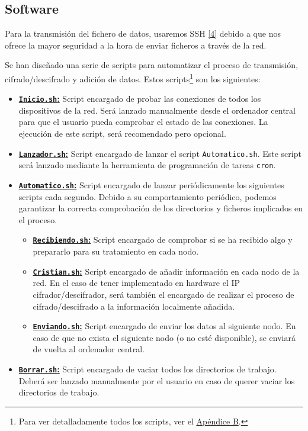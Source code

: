 \subsection{Software}
Para la transmisión del fichero de datos, usaremos SSH \hyperlink{4}{[4]} debido a que nos ofrece la mayor seguridad a la hora de enviar ficheros a través de la red.

Se han diseñado una serie de scripts para automatizar el proceso de transmisión, cifrado/descifrado y adición de datos. Estos scripts\footnote{Para ver detalladamente todos los scripts, ver el \hyperlink{Scripts}{Apéndice B}.} son los siguientes:
\begin{itemize}
	\item \hyperlink{ScriptConexion}{\textbf{\texttt{Inicio.sh}:}} Script encargado de probar las conexiones de todos los dispositivos de la red. Será lanzado manualmente desde el ordenador central para que el usuario pueda comprobar el estado de las conexiones. La ejecución de este script, será recomendado pero opcional.
	\item \hyperlink{ScriptLanzador}{\textbf{\texttt{Lanzador.sh}:}} Script encargado de lanzar el script \texttt{Automatico.sh}. Este script será lanzado mediante la herramienta de programación de tareas \texttt{cron}.
	\item \hyperlink{ScriptAutomatico}{\textbf{\texttt{Automatico.sh}:}} Script encargado de lanzar periódicamente los siguientes scripts cada segundo. Debido a su comportamiento periódico, podemos garantizar la correcta comprobación de los directorios y ficheros implicados en el proceso.
	\begin{itemize}
		\item \hyperlink{ScriptRecibiendo}{\textbf{\texttt{Recibiendo.sh}:}} Script encargado de comprobar si se ha recibido algo y prepararlo para su tratamiento en cada nodo.
		\item \hyperlink{ScriptCristian}{\textbf{\texttt{Cristian.sh}:}} Script encargado de añadir información en cada nodo de la red. En el caso de tener implementado en hardware el IP cifrador/descifrador, será también el encargado de realizar el proceso de cifrado/descifrado a la información localmente añadida.
		\item \hyperlink{ScriptEnviando}{\textbf{\texttt{Enviando.sh}:}} Script encargado de enviar los datos al siguiente nodo. En caso de que no exista el siguiente nodo (o no esté disponible), se enviará de vuelta al ordenador central.
	\end{itemize}
	\item \hyperlink{ScriptBorrar}{\textbf{\texttt{Borrar.sh}:}} Script encargado de vaciar todos los directorios de trabajo. Deberá ser lanzado manualmente por el usuario en caso de querer vaciar los directorios de trabajo.
\end{itemize}


